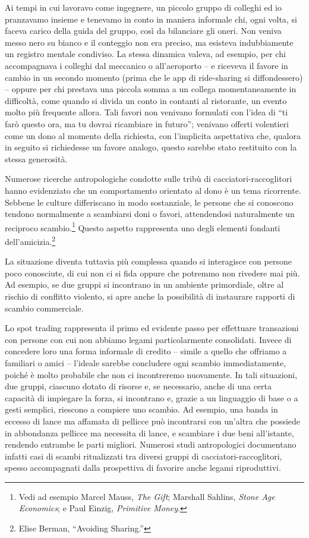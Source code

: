\documentclass[
  a5paper,
  smalldemyvopaper,10pt,twoside,onecolumn,openright,extrafontsizes,hidelinks]{memoir}
\begin{document}
Ai tempi in cui lavoravo come ingegnere, un piccolo gruppo di colleghi
ed io pranzavamo insieme e tenevamo in conto in maniera informale chi,
ogni volta, si faceva carico della guida del gruppo, così da bilanciare
gli oneri. Non veniva messo nero su bianco e il conteggio non era
preciso, ma esisteva indubbiamente un registro mentale condiviso. La
stessa dinamica valeva, ad esempio, per chi accompagnava i colleghi dal
meccanico o all'aeroporto -- e riceveva il favore in cambio in un
secondo momento (prima che le app di ride-sharing si diffondessero) --
oppure per chi prestava una piccola somma a un collega momentaneamente
in difficoltà, come quando si divida un conto in contanti al ristorante,
un evento molto più frequente allora. Tali favori non venivano formulati
con l'idea di ``ti farò questo ora, ma tu dovrai ricambiare in futuro'';
venivano offerti volentieri come un dono al momento della richiesta, con
l'implicita aspettativa che, qualora in seguito si richiedesse un favore
analogo, questo sarebbe stato restituito con la stessa generosità.

Numerose ricerche antropologiche condotte sulle tribù di
cacciatori-raccoglitori hanno evidenziato che un comportamento orientato
al dono è un tema ricorrente. Sebbene le culture differiscano in modo
sostanziale, le persone che si conoscono tendono normalmente a
scambiarsi doni o favori, attendendosi naturalmente un reciproco
scambio.\footnote{Vedi ad esempio Marcel Mauss, \emph{The Gift};
  Marshall Sahlins, \emph{Stone Age Economics}; e Paul Einzig,
  \emph{Primitive Money}.} Questo aspetto rappresenta uno degli elementi
fondanti dell'amicizia.\footnote{Elise Berman, ``Avoiding Sharing.''}

La situazione diventa tuttavia più complessa quando si interagisce con
persone poco conosciute, di cui non ci si fida oppure che potremmo non
rivedere mai più. Ad esempio, se due gruppi si incontrano in un ambiente
primordiale, oltre al rischio di conflitto violento, si apre anche la
possibilità di instaurare rapporti di scambio commerciale.

Lo spot trading rappresenta il primo ed evidente passo per effettuare
transazioni con persone con cui non abbiamo legami particolarmente
consolidati. Invece di concedere loro una forma informale di credito --
simile a quello che offriamo a familiari o amici -- l'ideale sarebbe
concludere ogni scambio immediatamente, poiché è molto probabile che non
ci incontreremo nuovamente. In tali situazioni, due gruppi, ciascuno
dotato di risorse e, se necessario, anche di una certa capacità di
impiegare la forza, si incontrano e, grazie a un linguaggio di base o a
gesti semplici, riescono a compiere uno scambio. Ad esempio, una banda
in eccesso di lance ma affamata di pellicce può incontrarsi con un'altra
che possiede in abbondanza pellicce ma necessita di lance, e scambiare i
due beni all'istante, rendendo entrambe le parti migliori. Numerosi
studi antropologici documentano infatti casi di scambi ritualizzati tra
diversi gruppi di cacciatori-raccoglitori, spesso accompagnati dalla
prospettiva di favorire anche legami riproduttivi.
\end{document}

